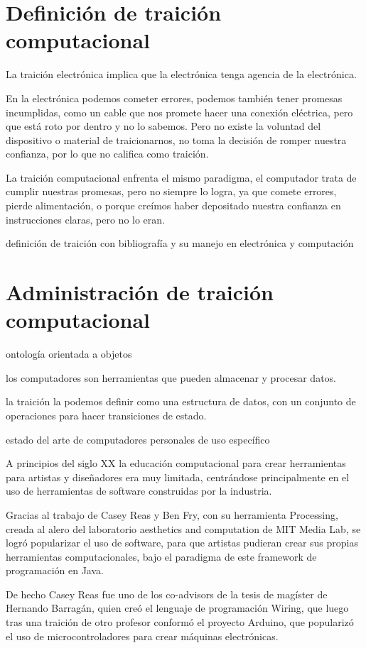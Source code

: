 \documentclass{article}
\begin{document}
\section{Definición de traición computacional}

La traición electrónica implica que la electrónica tenga agencia de la electrónica.

En la electrónica podemos cometer errores, podemos también tener promesas incumplidas, como un cable que nos promete hacer una conexión eléctrica, pero que está roto por dentro y no lo sabemos. Pero no existe la voluntad del dispositivo o material de traicionarnos, no toma la decisión de romper nuestra confianza, por lo que no califica como traición.

La traición computacional enfrenta el mismo paradigma, el computador trata de cumplir nuestras promesas, pero no siempre lo logra, ya que comete errores, pierde alimentación, o porque creímos haber depositado nuestra confianza en instrucciones claras, pero no lo eran.

definición de traición con bibliografía y su manejo en electrónica y computación

\clearpage

\section{Administración de traición computacional}

ontología orientada a objetos

los computadores son herramientas que pueden almacenar y procesar datos.

la traición la podemos definir como una estructura de datos, con un conjunto de operaciones para hacer transiciones de estado.

estado del arte de computadores personales de uso específico

A principios del siglo XX la educación computacional para crear herramientas para artistas y diseñadores era muy limitada, centrándose principalmente en el uso de herramientas de software construidas por la industria.

Gracias al trabajo de Casey Reas y Ben Fry, con su herramienta Processing, creada al alero del laboratorio aesthetics and computation de MIT Media Lab, se logró popularizar el uso de software, para que artistas pudieran crear sus propias herramientas computacionales, bajo el paradigma de este framework de programación en Java.

De hecho Casey Reas fue uno de los co-advisors de la tesis de magíster de Hernando Barragán, quien creó el lenguaje de programación Wiring, que luego tras una traición de otro profesor conformó el proyecto Arduino, que popularizó el uso de microcontroladores para crear máquinas electrónicas.
\end{document}
